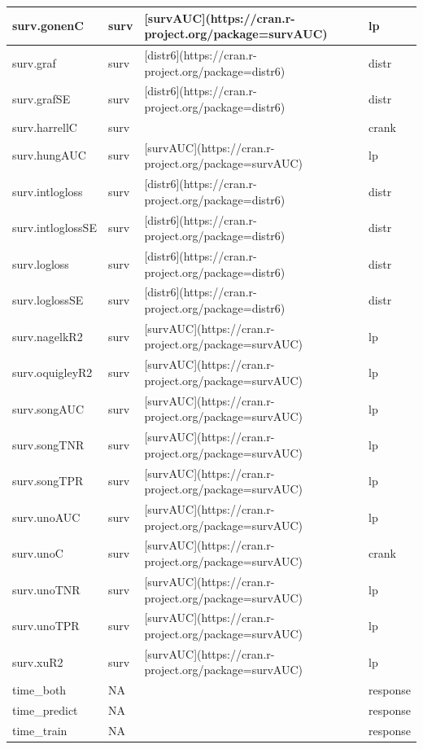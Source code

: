 \documentclass[]{article}
\begin{document}
\begin{tabular}{l|l|l|l|l}
\hline
surv.gonenC & surv & [survAUC](https://cran.r-project.org/package=survAUC) &  & lp\\
\hline
surv.graf & surv & [distr6](https://cran.r-project.org/package=distr6) &  & distr\\
\hline
surv.grafSE & surv & [distr6](https://cran.r-project.org/package=distr6) &  & distr\\
\hline
surv.harrellC & surv &  &  & crank\\
\hline
surv.hungAUC & surv & [survAUC](https://cran.r-project.org/package=survAUC) &  & lp\\
\hline
surv.intlogloss & surv & [distr6](https://cran.r-project.org/package=distr6) &  & distr\\
\hline
surv.intloglossSE & surv & [distr6](https://cran.r-project.org/package=distr6) &  & distr\\
\hline
surv.logloss & surv & [distr6](https://cran.r-project.org/package=distr6) &  & distr\\
\hline
surv.loglossSE & surv & [distr6](https://cran.r-project.org/package=distr6) &  & distr\\
\hline
surv.nagelkR2 & surv & [survAUC](https://cran.r-project.org/package=survAUC) &  & lp\\
\hline
surv.oquigleyR2 & surv & [survAUC](https://cran.r-project.org/package=survAUC) &  & lp\\
\hline
surv.songAUC & surv & [survAUC](https://cran.r-project.org/package=survAUC) &  & lp\\
\hline
surv.songTNR & surv & [survAUC](https://cran.r-project.org/package=survAUC) &  & lp\\
\hline
surv.songTPR & surv & [survAUC](https://cran.r-project.org/package=survAUC) &  & lp\\
\hline
surv.unoAUC & surv & [survAUC](https://cran.r-project.org/package=survAUC) &  & lp\\
\hline
surv.unoC & surv & [survAUC](https://cran.r-project.org/package=survAUC) &  & crank\\
\hline
surv.unoTNR & surv & [survAUC](https://cran.r-project.org/package=survAUC) &  & lp\\
\hline
surv.unoTPR & surv & [survAUC](https://cran.r-project.org/package=survAUC) &  & lp\\
\hline
surv.xuR2 & surv & [survAUC](https://cran.r-project.org/package=survAUC) &  & lp\\
\hline
time\_both & NA &  &  & response\\
\hline
time\_predict & NA &  &  & response\\
\hline
time\_train & NA &  &  & response\\
\hline
\end{tabular}
\end{document}
